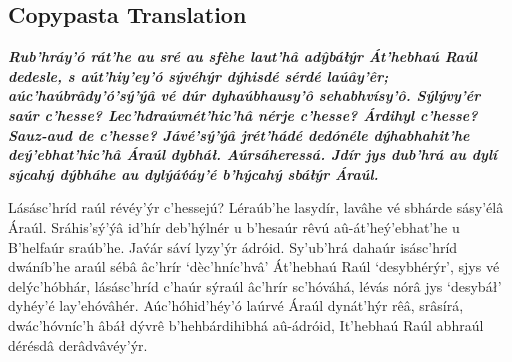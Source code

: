 \documentclass[a4paper, 12pt, twoside, final]{article}
\begin{document}
\subsection{Copypasta Translation}
{\itshape\bfseries
Rub’hráy’ó rát’he au sré au sfèhe laut’hâ adŷbáłýr Át’hebhaú Raúl dedesle, s aút’hiy’ey’ó sývéhýr dýhisdé sérdé laúây’êr;
aúc’haúbrâdy’ó’sý’ýâ vé dúr dyhaúbhausy’ô sehabhvísy’ô. Sýlývy’ér saúr c’hesse? Lec’hdr\-aúv\-nét’hic’hâ nérje c’hesse?
Árdihyl c’hesse? Sauz-aud de c’hesse? Jávé’sý’ýâ jrét’hádé dedónéle dýha\-bha\-hit’he deý’ebhat’hic’hâ Áraúl dybháł.
Aúrsáheressá. Jdír jys dub’hrá au dylí sýcahý dýbháhe au dylýáv́áy’é b’hýcahý sbáłýr Áraúl.

Lásásc’hríd raúl révéy’ýr c’hessejú? Léraúb’he lasydír, lavâhe vé sbhárde sásy’élâ Áraúl. Sráhis’sý’ýâ id’hír deb’hýlnér
u b’hesaúr rêvú aû-át’heý’ebhat’he u B’helfaúr sraúb’he. Jav́ár sáví lyzy’ýr ádróid. Sy’u\-b’h\-rá dahaúr isásc’hríd
dwáníb’he araúl sébâ âc’hrír ‘dèc’hníc’hvâ’ Át’hebhaú Raúl ‘desybhérýr’, sjys vé delýc’hóbhár, lásásc’hríd c’haúr sýraúl
âc’hrír sc’hóváhá, lévás nórâ jys ‘desybáł’ dyhéy’é la\-y’e\-hó\-vâ\-hér. Aúc’hóhid’héy’ó laúrvé Áraúl dynát’hýr rêâ, srâsírá,
dwác’hóvníc’h âbáł dývrê b’hehbár\-di\-hi\-bhá aû-á\-dr\-ó\-id, It’hebhaú Raúl abhraúl dérésdâ derâdvâvéy’ýr.
}

\end{document}
